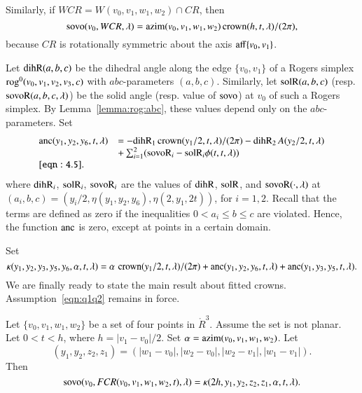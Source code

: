 Similarly, if $WCR = W(v_0,v_1,w_1,w_2) \cap CR$, then
$$
{\operatorname{sovo}}(v_0,WCR,\lambda) = {\operatorname{azim}}(v_0,v_1,w_1,w_2)\operatorname{crown}(h,t,\lambda)/(2\pi),
$$
because $CR$ 
is rotationally symmetric about the axis ${\operatorname{aff}}\{v_0,v_1\}$.



Let ${\operatorname{dihR}}(a,b,c)$ be the dihedral angle along the edge
$\{v_0,v_1\}$ of a
Rogers simplex ${\operatorname{rog}}^0(v_0,v_1,v_2,v_3,c)$ with $abc$-parameters
$(a,b,c)$.  Similarly, let ${\operatorname{solR}}(a,b,c)$ (resp. ${\operatorname{sovoR}}(a,b,c,\lambda)$)
be the solid angle (resp. value of ${\operatorname{sovo}}$)
at $v_0$ of such a Rogers simplex.  By Lemma~\ref{lemma:rog:abc},
these values depend only on the $abc$-parameters.
Set
    \begin{equation}
    \begin{array}{lll}
    \anc(y_1,y_2,y_6,t,\lambda) &= 
     -\op{dihR}_1\cro(y_1/2,t,\lambda)/(2\pi)
    -\op{dihR}_2\, A(y_2/2,t,\lambda) \\
      &+\sum_{i=1}^2 (\op{sovoR}_i - \op{solR}_i \phi(t,t,\lambda))\\
    \tlabel{eqn:4.5}
    \end{array}
    \end{equation}
where ${\operatorname{dihR}}_i$, ${\operatorname{solR}}_i$, ${\operatorname{sovoR}}_i$ are the values
of ${\operatorname{dihR}}$, ${\operatorname{solR}}$, and ${\operatorname{sovoR}}(\cdot,\lambda)$
at $(a_i,b,c) = (y_i/2,\eta(y_1,y_2,y_6),\eta(2,y_1,2t))$, for $i=1,2$.
Recall that the terms are defined as zero if the inequalities
$0 < a_i \le b\le c$ are violated.  Hence, the function $\operatorname{anc}$ is
zero, except at points in a certain domain.

Set
    $$\kappa(y_1,y_2,y_3,y_5,y_6,\alpha,t,\lambda) =
   \alpha\,\operatorname{crown}(y_1/2,t,\lambda)/(2\pi) +
        \operatorname{anc}(y_1,y_2,y_6,t,\lambda)+\operatorname{anc}(y_1,y_3,y_5,t,\lambda).
    $$
We are finally ready to state the main result about fitted crowns.
Assumption~\ref{eqn:q1q2} remains in force.

\begin{lemma}\label{lemma:sovo:FCR}
Let $\{v_0,v_1,w_1,w_2\}$ be a set of four points in $\ring{R}^3$.
Assume the set is not planar.
Let $0 < t < h$, where $h = |v_1-v_0|/2$.
Set $\alpha = {\operatorname{azim}}(v_0,v_1,w_1,w_2)$.
Let 
 $$(y_1,y_2,z_2,z_1) =
   (|w_1-v_0|,|w_2-v_0|,|w_2-v_1|,|w_1-v_1|).
 $$
Then
$$
{\operatorname{sovo}}(v_0,FCR(v_0,v_1,w_1,w_2,t),\lambda) =
 \kappa(2h,y_1,y_2,z_2,z_1,\alpha,t,\lambda).
$$
\end{lemma}

